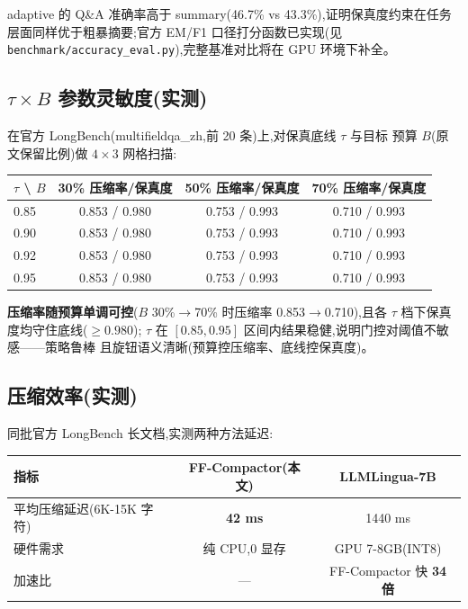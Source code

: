 \documentclass[11pt,a4paper]{article}
\begin{document}
adaptive 的 Q\&A 准确率高于 summary(46.7\% vs 43.3\%),证明保真度约束在任务
层面同样优于粗暴摘要;官方 EM/F1 口径打分函数已实现(见
\texttt{benchmark/accuracy\_eval.py}),完整基准对比将在 GPU 环境下补全。

\subsection{$\tau \times B$ 参数灵敏度(实测)}

在官方 LongBench(multifieldqa\_zh,前 20 条)上,对保真底线 $\tau$ 与目标
预算 $B$(原文保留比例)做 $4\times3$ 网格扫描:

\begin{table}[h]
  \centering
  \begin{tabular}{@{}lccc@{}}
    \toprule
    $\tau$ \textbackslash{} $B$ & 30\% 压缩率/保真度 & 50\% 压缩率/保真度 & 70\% 压缩率/保真度 \\
    \midrule
    0.85 & 0.853 / 0.980 & 0.753 / 0.993 & 0.710 / 0.993 \\
    0.90 & 0.853 / 0.980 & 0.753 / 0.993 & 0.710 / 0.993 \\
    0.92 & 0.853 / 0.980 & 0.753 / 0.993 & 0.710 / 0.993 \\
    0.95 & 0.853 / 0.980 & 0.753 / 0.993 & 0.710 / 0.993 \\
    \bottomrule
  \end{tabular}
\end{table}

\textbf{压缩率随预算单调可控}($B$ 30\%$\rightarrow$70\% 时压缩率
0.853$\rightarrow$0.710),且各 $\tau$ 档下保真度均守住底线($\ge 0.980$);
$\tau$ 在 $[0.85, 0.95]$ 区间内结果稳健,说明门控对阈值不敏感——策略鲁棒
且旋钮语义清晰(预算控压缩率、底线控保真度)。

\subsection{压缩效率(实测)}

同批官方 LongBench 长文档,实测两种方法延迟:

\begin{table}[h]
  \centering
  \begin{tabular}{@{}lcc@{}}
    \toprule
    指标 & FF-Compactor(本文) & LLMLingua-7B \\
    \midrule
    平均压缩延迟(6K-15K 字符) & \textbf{42 ms} & 1440 ms \\
    硬件需求 & 纯 CPU,0 显存 & GPU 7-8GB(INT8) \\
    加速比 & — & FF-Compactor 快 \textbf{34 倍} \\
    \bottomrule
  \end{tabular}
\end{table}
\end{document}
